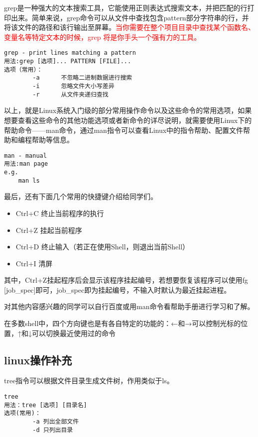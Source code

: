 grep是一种强大的文本搜索工具，它能使用正则表达式搜索文本，并把匹配的行打印出来。简单来说，grep命令可以从文件中查找包含pattern部分字符串的行，并将该文件的路径和该行输出至屏幕。\textcolor{red}{当你需要在整个项目目录中查找某个函数名、变量名等特定文本的时候，grep 将是你手头一个强有力的工具。}

\begin{verbatim}
grep - print lines matching a pattern
用法:grep [选项]... PATTERN [FILE]...
选项（常用）：
		-a		不忽略二进制数据进行搜索
		-i		忽略文件大小写差异
		-r		从文件夹递归查找
\end{verbatim}

以上，就是Linux系统入门级的部分常用操作命令以及这些命令的常用选项，如果想要查看这些命令的其他功能选项或者新命令的详尽说明，就需要使用Linux下的帮助命令——man命令，通过man指令可以查看Linux中的指令帮助、配置文件帮助和编程帮助等信息。

\begin{verbatim}
man - manual
用法:man page
e.g.
	man ls
\end{verbatim}

最后，还有下面几个常用的快捷键介绍给同学们。
\begin{itemize}
    \item Ctrl+C	终止当前程序的执行
	\item Ctrl+Z	挂起当前程序
	\item Ctrl+D	终止输入（若正在使用Shell，则退出当前Shell）
	\item Ctrl+I	清屏
\end{itemize}

其中，Ctrl+Z挂起程序后会显示该程序挂起编号，若想要恢复该程序可以使用fg [job\_spec]即可，job\_spec即为挂起编号，不输入时默认为最近挂起进程。

对其他内容感兴趣的同学可以自行百度或用man命令看帮助手册进行学习和了解。

\begin{note}
在多数shell中，四个方向键也是有各自特定的功能的：←和→可以控制光标的位置，↑和↓可以切换最近使用过的命令
\end{note}


\subsection{linux操作补充}
tree指令可以根据文件目录生成文件树，作用类似于ls。
\begin{verbatim}
tree
用法：tree [选项] [目录名]
选项(常用)：
        -a 列出全部文件
        -d 只列出目录
\end{verbatim}

